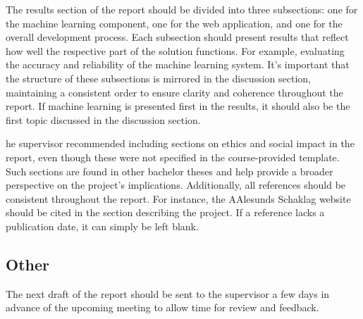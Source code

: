 The results section of the report should be divided into three subsections: one for the machine learning component, one for the web application, and one for the overall development process. Each subsection should present results that reflect how well the respective part of the solution functions. For example, evaluating the accuracy and reliability of the machine learning system. It’s important that the structure of these subsections is mirrored in the discussion section, maintaining a consistent order to ensure clarity and coherence throughout the report. If machine learning is presented first in the results, it should also be the first topic discussed in the discussion section.

he supervisor recommended including sections on ethics and social impact in the report, even though these were not specified in the course-provided template. Such sections are found in other bachelor theses and help provide a broader perspective on the project's implications. Additionally, all references should be consistent throughout the report. For instance, the AAlesunds Schaklag website should be cited in the section describing the project. If a reference lacks a publication date, it can simply be left blank.

\subsection{Other}
The next draft of the report should be sent to the supervisor a few days in advance of the upcoming meeting to allow time for review and feedback.